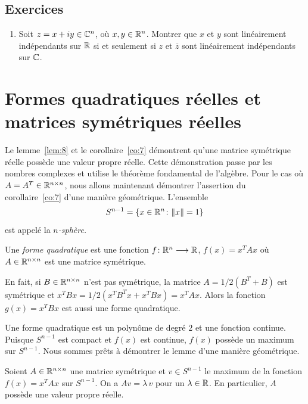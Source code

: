 \subsection*{Exercices}

\begin{enumerate}
\item Soit $z = x + iy \in \mathbb{C}^n$, où $x,y \in \mathbb{R}^n$. Montrer que $x$ et $y$ sont linéairement indépendants sur $\mathbb{R}$ si et seulement si $z$ et $\overline{z}$ sont linéairement indépendants sur  $\mathbb{C}$. 
\end{enumerate}


\section{Formes quadratiques réelles et matrices symétriques réelles}
\label{sec:form-quadr-reell}

Le lemme~\ref{lem:8} et le corollaire~\ref{co:7} démontrent qu'une matrice symétrique réelle possède une valeur propre réelle. Cette démonstration passe par les nombres complexes et utilise le théorème fondamental de l'algèbre. Pour le cas où $A = A^T \in \mathbb{R}^{n \times n}$, nous allons maintenant démontrer l'assertion du  corollaire~\ref{co:7}  d'une manière géométrique. L'ensemble 
\begin{displaymath}
  S^{n-1} = \{x \in \mathbb{R}^n \colon \|x\| = 1 \} 
\end{displaymath}
est appelé la \emph{$n$-sphère.} 

\begin{definition}
  \label{def:21}
  Une \emph{forme quadratique} est une fonction
  $f\colon \mathbb{R}^n \longrightarrow \mathbb{R}$,
  $f(x) = x^T A x$
  où $A \in \mathbb{R}^{n \times n}$ est une matrice symétrique.
\end{definition}
En fait, si $B \in \mathbb{R}^{n \times n}$
n'est pas symétrique, la matrice $A = 1/2 (B^T + B)$
est symétrique et $x^TBx = 1/2 (x^TB^T x + x^T B x) = x^T Ax$.
Alors la fonction $g(x) = x^TBx$ est aussi une forme quadratique.

Une {forme quadratique} est un polynôme de degré $2$
et une fonction continue. Puisque $S^{n-1}$
est compact et $f(x)$
est continue, $f(x)$
possède un maximum sur $S^{n-1}$.
Nous sommes prêts à démontrer le lemme d'une manière géométrique.

\begin{lemma}
  \label{lem:7}
  Soient $A \in \mathbb{R}^{n \times n}$ une matrice symétrique et $v \in S^{n-1}$ le maximum de la fonction $f(x) = x^TAx$ sur $S^{n-1}$. On a $Av = \lambda\, v$ pour  un $\lambda \in \mathbb{R}$. En particulier, $A$ possède une valeur propre réelle. 
\end{lemma}

